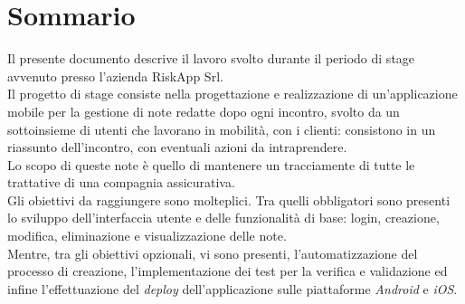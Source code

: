 \cleardoublepage
{}
{}
\begingroup
\let\clearpage\relax
\let\cleardoublepage\relax
\let\cleardoublepage\relax

\chapter*{Sommario}

Il presente documento descrive il lavoro svolto durante il periodo di stage avvenuto presso l'azienda RiskApp Srl. \\

\noindent Il progetto di stage consiste nella progettazione e realizzazione di un'applicazione mobile per la gestione di note redatte dopo ogni incontro, svolto da un sottoinsieme di utenti che lavorano in mobilità, con i clienti: consistono in un riassunto dell'incontro, con eventuali azioni da intraprendere.\\
Lo scopo di queste note è quello di mantenere un tracciamente di tutte le trattative di una compagnia assicurativa.\\


\noindent Gli obiettivi da raggiungere sono molteplici. Tra quelli obbligatori sono presenti lo sviluppo dell'interfaccia utente e delle funzionalità di base: login, creazione, modifica, eliminazione e visualizzazione delle note.\\
Mentre, tra gli obiettivi opzionali, vi sono presenti, l'automatizzazione del processo di creazione, l'implementazione dei test per la verifica e validazione ed infine l'effettuazione del \emph{deploy} dell'applicazione sulle piattaforme \emph{Android} e \emph{iOS}.\\




\endgroup

\vfill
